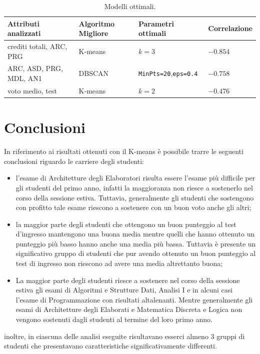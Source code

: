 \documentclass[12pt]{article}
\begin{document}
\begin{table}[H]
\begin{adjustbox}{max width=\textwidth}
\begin{tabular}{@{}llll@{}}
\toprule
Attributi analizzati     & Algoritmo Migliore & Parametri ottimali & Correlazione \\ \midrule
crediti totali, ARC, PRG & K-means            & $k=3$                & $-0.854$       \\
ARC, ASD, PRG, MDL, AN1  & DBSCAN             & \texttt{MinPts=20},\texttt{eps=0.4}  & $-0.758$ \\
voto medio, test         & K-means            & $k=2$                & $-0.476$       \\ \bottomrule
\end{tabular}
\end{adjustbox}
\caption{Modelli ottimali.}
\label{tab:mod-opt}
\end{table}

\newpage

\section{Conclusioni}
In riferimento ai risultati ottenuti con il K-means è possibile trarre le seguenti conclusioni riguardo
le carriere degli studenti:
\begin{itemize}
\item l'esame di Architetture degli Elaboratori risulta essere l'esame più difficile per gli studenti del primo anno,
  infatti la maggioranza non riesce a sostenerlo nel corso della sessione estiva. Tuttavia, general\-mente gli studenti 
  che sostengono con profitto tale esame riescono a sostenere con un buon voto anche gli altri; 
\item la maggior parte degli studenti che ottengono un buon punteggio al test d'ingresso mantengono una buona media
  mentre quelli che hanno ottenuto un punteggio più basso hanno anche una media più bassa. Tuttavia è presente
  un significativo gruppo di studenti che pur avendo ottenuto un buon punteggio al test di ingresso non rie\-scono
  ad avere una media altrettanto buona;
\item La maggior parte degli studenti riesce a sostenere nel corso della sessione estiva gli esami di Algoritmi e 
  Strutture Dati, Analisi I e in alcuni casi l'esame di Programmazione con risultati altalenanti. Mentre 
  generalmente gli esami di Architetture degli Elaborati e Ma\-tematica Discreta e Logica non vengono sostenuti
  dagli studenti al termine del loro primo anno.
\end{itemize}
inoltre, in ciascuna delle analisi eseguite risultavano esserci almeno 3 gruppi di studenti che presentavano 
caratteristiche significativamente differenti.
\end{document}
